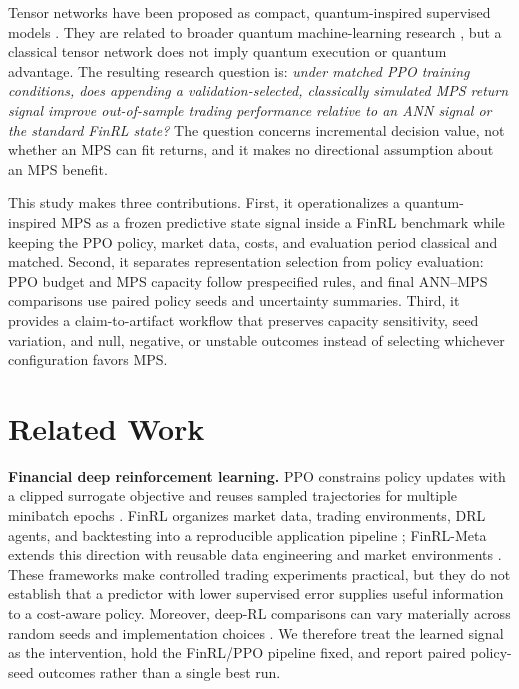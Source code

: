 \documentclass[conference]{IEEEtran}
\begin{document}
Tensor networks have been proposed as compact, quantum-inspired supervised
models \cite{stoudenmire2016supervised}. They are related to broader quantum
machine-learning research \cite{biamonte2017quantum}, but a classical tensor
network does not imply quantum execution or quantum advantage. The resulting
research question is: \emph{under matched PPO training conditions, does
appending a validation-selected, classically simulated MPS return signal
improve out-of-sample trading performance relative to an ANN signal or the
standard FinRL state?} The question concerns incremental decision value, not
whether an MPS can fit returns, and it makes no directional assumption about
an MPS benefit.

This study makes three contributions. First, it operationalizes a
quantum-inspired MPS as a frozen predictive state signal inside a FinRL
benchmark while keeping the PPO policy, market data, costs, and evaluation
period classical and matched. Second, it separates representation selection
from policy evaluation: PPO budget and MPS capacity follow prespecified rules,
and final ANN--MPS comparisons use paired policy seeds and uncertainty
summaries. Third, it provides a claim-to-artifact workflow that preserves
capacity sensitivity, seed variation, and null, negative, or unstable outcomes
instead of selecting whichever configuration favors MPS.

\section{Related Work}

\textbf{Financial deep reinforcement learning.}
PPO constrains policy updates with a clipped surrogate objective and reuses
sampled trajectories for multiple minibatch epochs
\cite{schulman2017ppo}. FinRL organizes market data, trading environments, DRL
agents, and backtesting into a reproducible application pipeline
\cite{liu2020finrl}; FinRL-Meta extends this direction with reusable data
engineering and market environments \cite{liu2021finrlmeta}. These frameworks
make controlled trading experiments practical, but they do not establish that
a predictor with lower supervised error supplies useful information to a
cost-aware policy. Moreover, deep-RL comparisons can vary materially across
random seeds and implementation choices \cite{henderson2018deep}. We therefore
treat the learned signal as the intervention, hold the FinRL/PPO pipeline fixed,
and report paired policy-seed outcomes rather than a single best run.
\end{document}
